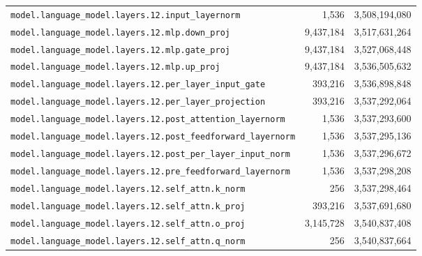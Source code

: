 \documentclass[10pt,a4paper]{article}
\theoremstyle{definition}
\begin{document}
\begin{appendices}
\begin{longtable}{p{9.5cm}rr}
\texttt{model.\allowbreak{}language\_model.\allowbreak{}layers.\allowbreak{}12.\allowbreak{}input\_layernorm} & 1,536 & 3,508,194,080 \\
\texttt{model.\allowbreak{}language\_model.\allowbreak{}layers.\allowbreak{}12.\allowbreak{}mlp.\allowbreak{}down\_proj} & 9,437,184 & 3,517,631,264 \\
\texttt{model.\allowbreak{}language\_model.\allowbreak{}layers.\allowbreak{}12.\allowbreak{}mlp.\allowbreak{}gate\_proj} & 9,437,184 & 3,527,068,448 \\
\texttt{model.\allowbreak{}language\_model.\allowbreak{}layers.\allowbreak{}12.\allowbreak{}mlp.\allowbreak{}up\_proj} & 9,437,184 & 3,536,505,632 \\
\texttt{model.\allowbreak{}language\_model.\allowbreak{}layers.\allowbreak{}12.\allowbreak{}per\_layer\_input\_gate} & 393,216 & 3,536,898,848 \\
\texttt{model.\allowbreak{}language\_model.\allowbreak{}layers.\allowbreak{}12.\allowbreak{}per\_layer\_projection} & 393,216 & 3,537,292,064 \\
\texttt{model.\allowbreak{}language\_model.\allowbreak{}layers.\allowbreak{}12.\allowbreak{}post\_attention\_layernorm} & 1,536 & 3,537,293,600 \\
\texttt{model.\allowbreak{}language\_model.\allowbreak{}layers.\allowbreak{}12.\allowbreak{}post\_feedforward\_layernorm} & 1,536 & 3,537,295,136 \\
\texttt{model.\allowbreak{}language\_model.\allowbreak{}layers.\allowbreak{}12.\allowbreak{}post\_per\_layer\_input\_norm} & 1,536 & 3,537,296,672 \\
\texttt{model.\allowbreak{}language\_model.\allowbreak{}layers.\allowbreak{}12.\allowbreak{}pre\_feedforward\_layernorm} & 1,536 & 3,537,298,208 \\
\texttt{model.\allowbreak{}language\_model.\allowbreak{}layers.\allowbreak{}12.\allowbreak{}self\_attn.\allowbreak{}k\_norm} & 256 & 3,537,298,464 \\
\texttt{model.\allowbreak{}language\_model.\allowbreak{}layers.\allowbreak{}12.\allowbreak{}self\_attn.\allowbreak{}k\_proj} & 393,216 & 3,537,691,680 \\
\texttt{model.\allowbreak{}language\_model.\allowbreak{}layers.\allowbreak{}12.\allowbreak{}self\_attn.\allowbreak{}o\_proj} & 3,145,728 & 3,540,837,408 \\
\texttt{model.\allowbreak{}language\_model.\allowbreak{}layers.\allowbreak{}12.\allowbreak{}self\_attn.\allowbreak{}q\_norm} & 256 & 3,540,837,664 \\

\end{longtable}
\end{appendices}
\end{document}
